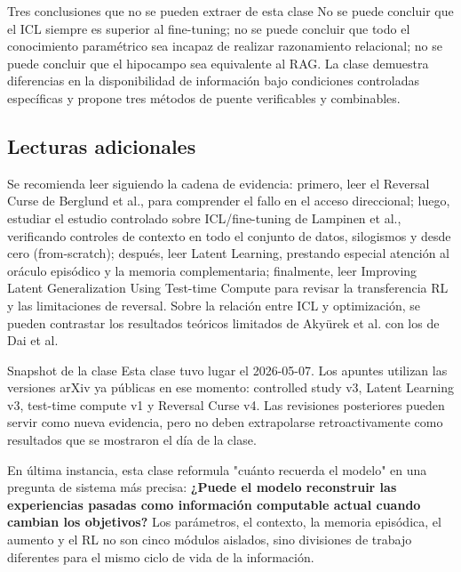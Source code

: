 \begin{warningbox}{Tres conclusiones que no se pueden extraer de esta clase}
No se puede concluir que el ICL siempre es superior al fine-tuning; no se puede concluir que todo el conocimiento paramétrico sea incapaz de realizar razonamiento relacional; no se puede concluir que el hipocampo sea equivalente al RAG. La clase demuestra diferencias en la disponibilidad de información bajo condiciones controladas específicas y propone tres métodos de puente verificables y combinables.
\end{warningbox}

\subsection{Lecturas adicionales}

Se recomienda leer siguiendo la cadena de evidencia: primero, leer el Reversal Curse de Berglund et al., para comprender el fallo en el acceso direccional; luego, estudiar el estudio controlado sobre ICL/fine-tuning de Lampinen et al., verificando controles de contexto en todo el conjunto de datos, silogismos y desde cero (from-scratch); después, leer Latent Learning, prestando especial atención al oráculo episódico y la memoria complementaria; finalmente, leer Improving Latent Generalization Using Test-time Compute para revisar la transferencia RL y las limitaciones de reversal. Sobre la relación entre ICL y optimización, se pueden contrastar los resultados teóricos limitados de Akyürek et al. con los de Dai et al.

\begin{knowledgebox}{Snapshot de la clase}
Esta clase tuvo lugar el 2026-05-07. Los apuntes utilizan las versiones arXiv ya públicas en ese momento: controlled study v3, Latent Learning v3, test-time compute v1 y Reversal Curse v4. Las revisiones posteriores pueden servir como nueva evidencia, pero no deben extrapolarse retroactivamente como resultados que se mostraron el día de la clase.
\end{knowledgebox}

En última instancia, esta clase reformula "cuánto recuerda el modelo" en una pregunta de sistema más precisa: \textbf{¿Puede el modelo reconstruir las experiencias pasadas como información computable actual cuando cambian los objetivos?} Los parámetros, el contexto, la memoria episódica, el aumento y el RL no son cinco módulos aislados, sino divisiones de trabajo diferentes para el mismo ciclo de vida de la información.


